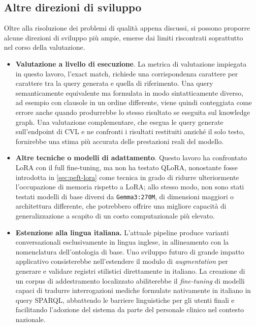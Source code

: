\documentclass[12pt,a4paper,openright,twoside]{book}
\begin{document}
\subsection{Altre direzioni di sviluppo}
\label{sec:future-other}

Oltre alla risoluzione dei problemi di qualità appena discussi, si possono
proporre alcune direzioni di sviluppo più ampie, emerse dai limiti riscontrati
soprattutto nel corso della valutazione.

\begin{itemize}
    \item \textbf{Valutazione a livello di esecuzione}. La metrica di
          valutazione impiegata in questo lavoro, l'exact match, richiede una
          corrispondenza carattere per carattere tra la query generata e quella
          di riferimento. Una query semanticamente equivalente ma formulata in
          modo sintatticamente diverso, ad esempio con clausole in un ordine
          differente, viene quindi conteggiata come errore anche quando
          produrrebbe lo stesso risultato se eseguita sul knowledge graph. Una
          valutazione complementare, che esegua le query generate sull'endpoint
          di CVL e ne confronti i risultati restituiti anziché il solo testo,
          fornirebbe una stima più accurata delle prestazioni reali del modello.
    \item \textbf{Altre tecniche o modelli di adattamento}. Questo lavoro ha
          confrontato LoRA con il full fine-tuning, ma non ha testato QLoRA,
          nonostante fosse introdotta in \cref{sec:peft-lora} come tecnica in
          grado di ridurre ulteriormente l'occupazione di memoria rispetto a
          LoRA; allo stesso modo, non sono stati testati modelli di base diversi
          da \texttt{Gemma3:270M}, di dimensioni maggiori o architettura
          differente, che potrebbero offrire una migliore capacità di
          generalizzazione a scapito di un costo computazionale più elevato.
    \item \textbf{Estenzione alla lingua
              italiana.} L'attuale pipeline produce varianti conversazionali
          esclusivamente in lingua inglese, in allineamento con la nomenclatura
          dell'ontologia di base. Uno sviluppo futuro di grande impatto applicativo
          consisterebbe nell'estendere il modulo di \textit{augmentation} per generare
          e validare registri stilistici direttamente in italiano. La creazione di un
          corpus di addestramento localizzato abiliterebbe il \textit{fine-tuning} di
          modelli capaci di tradurre interrogazioni mediche formulate nativamente in
          italiano in query SPARQL, abbattendo le barriere linguistiche per gli utenti
          finali e facilitando l'adozione del sistema da parte del personale clinico
          nel contesto nazionale.
\end{itemize}
\end{document}
